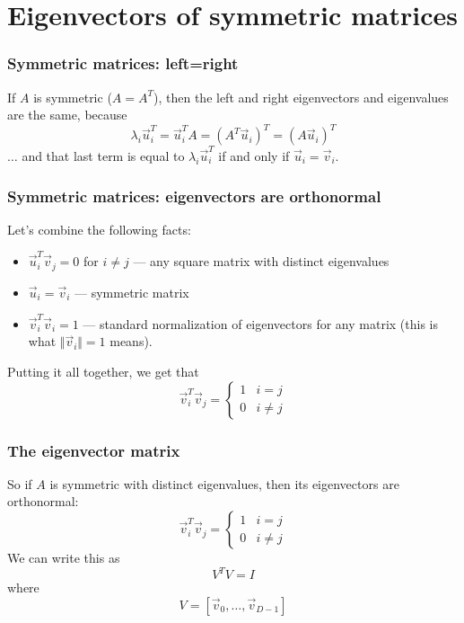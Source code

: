 \documentclass{beamer}
\begin{document}
\section[Symmetric]{Eigenvectors of symmetric matrices}
\setcounter{subsection}{1}


\begin{frame}
  \frametitle{Symmetric matrices: left=right}

  If $A$ is symmetric ($A=A^T$), then the left and right eigenvectors
  and eigenvalues are the same, because
  \[
  \lambda_i\vec{u}_i^T=\vec{u}_i^TA=(A^T\vec{u}_i)^T=(A\vec{u}_i)^T
  \]
  $\ldots$ and that last term is equal to $\lambda_i\vec{u}_i^T$ if and
  only if $\vec{u}_i=\vec{v}_i$.
\end{frame}

\begin{frame}
  \frametitle{Symmetric matrices: eigenvectors are orthonormal}
  Let's combine the following facts:
  \begin{itemize}
  \item $\vec{u}_i^T\vec{v}_j=0$ for $i\ne j$ --- any square matrix with distinct
    eigenvalues
  \item $\vec{u}_i=\vec{v}_i$ --- symmetric matrix
  \item $\vec{v}_i^T\vec{v}_i=1$ --- standard normalization of
    eigenvectors for any matrix (this is what $\Vert\vec{v}_i\Vert=1$ means).
  \end{itemize}
  Putting it all together, we get that
  \[
  \vec{v}_i^T\vec{v}_j=
  \begin{cases}
    1&i=j\\
    0&i\ne j
  \end{cases}
  \]
\end{frame}

\begin{frame}
  \frametitle{The eigenvector matrix}
  So if $A$ is symmetric with distinct eigenvalues, then
  its eigenvectors  are orthonormal:
  \[
  \vec{v}_i^T\vec{v}_j=
  \begin{cases}
    1&i=j\\
    0&i\ne j
  \end{cases}
  \]
  We can  write this as
  \[
  V^TV = I
  \]
  where
  \[
  V=\left[\vec{v}_0,\ldots,\vec{v}_{D-1}\right]
  \]
\end{frame}
\end{document}
